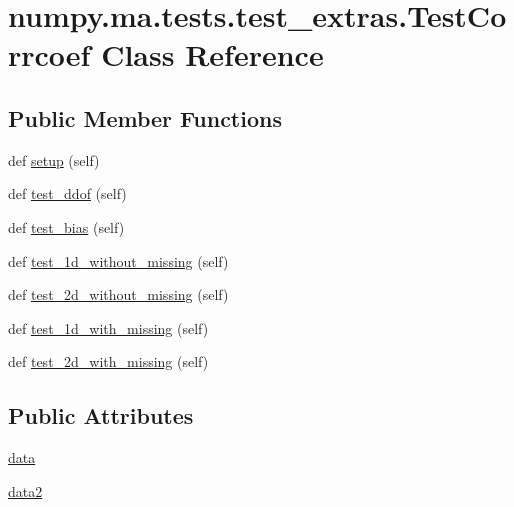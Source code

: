 \hypertarget{classnumpy_1_1ma_1_1tests_1_1test__extras_1_1TestCorrcoef}{}\section{numpy.\+ma.\+tests.\+test\+\_\+extras.\+Test\+Corrcoef Class Reference}
\label{classnumpy_1_1ma_1_1tests_1_1test__extras_1_1TestCorrcoef}
\subsection*{Public Member Functions}
\begin{DoxyCompactItemize}
\item 
def \hyperlink{classnumpy_1_1ma_1_1tests_1_1test__extras_1_1TestCorrcoef_a68bba3d4911f723f56738ccdb95f2d5f}{setup} (self)
\item 
def \hyperlink{classnumpy_1_1ma_1_1tests_1_1test__extras_1_1TestCorrcoef_abfffb32e99cfc839fd84faf6a9a276a2}{test\+\_\+ddof} (self)
\item 
def \hyperlink{classnumpy_1_1ma_1_1tests_1_1test__extras_1_1TestCorrcoef_acb95a8cb3b586737baebc2b2049ea386}{test\+\_\+bias} (self)
\item 
def \hyperlink{classnumpy_1_1ma_1_1tests_1_1test__extras_1_1TestCorrcoef_ad632c47289bb5cd3231418855c4ff48d}{test\+\_\+1d\+\_\+without\+\_\+missing} (self)
\item 
def \hyperlink{classnumpy_1_1ma_1_1tests_1_1test__extras_1_1TestCorrcoef_a2ba2e2ae158c73b73e965deecd880c2d}{test\+\_\+2d\+\_\+without\+\_\+missing} (self)
\item 
def \hyperlink{classnumpy_1_1ma_1_1tests_1_1test__extras_1_1TestCorrcoef_acda802782d84f6476861ec3c2801ccfc}{test\+\_\+1d\+\_\+with\+\_\+missing} (self)
\item 
def \hyperlink{classnumpy_1_1ma_1_1tests_1_1test__extras_1_1TestCorrcoef_a3cd2d358c3413166960333c8755a93b0}{test\+\_\+2d\+\_\+with\+\_\+missing} (self)
\end{DoxyCompactItemize}
\subsection*{Public Attributes}
\begin{DoxyCompactItemize}
\item 
\hyperlink{classnumpy_1_1ma_1_1tests_1_1test__extras_1_1TestCorrcoef_a80a57950f6a86baef537394a3d889685}{data}
\item 
\hyperlink{classnumpy_1_1ma_1_1tests_1_1test__extras_1_1TestCorrcoef_a655680d89d8bff0ef7099ca1494cf3d9}{data2}
\end{DoxyCompactItemize}


